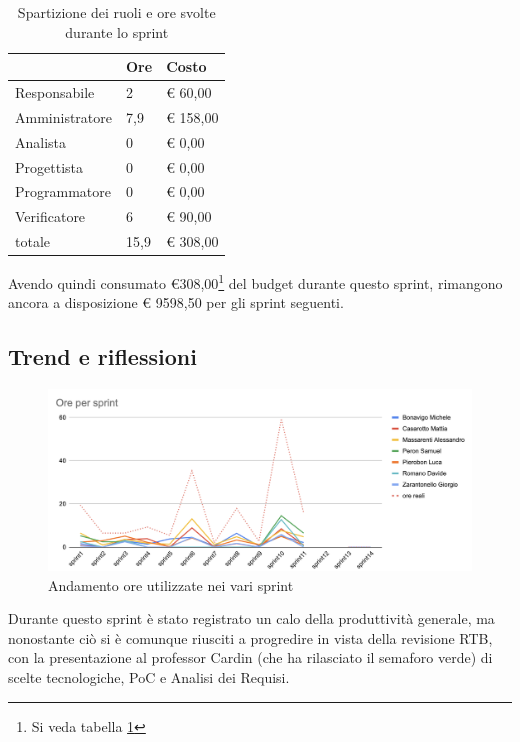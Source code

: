 \begin{table}[ht]
    \begin{tabularx}{\linewidth}{X|l|l}
    \rowcolor{gray!30}& Ore & Costo \\
    \hline
    
    Responsabile & 2 & € 60,00 \\
    \rowcolor{gray!10}Amministratore & 7,9 & € 158,00 \\
    Analista & 0 & € 0,00 \\
    \rowcolor{gray!10}Progettista & 0 & € 0,00 \\
    Programmatore & 0 & € 0,00 \\
    \rowcolor{gray!10}Verificatore & 6 &€ 90,00 \\
    totale & 15,9 & € 308,00 \\
    \end{tabularx}
    \caption{\label{costi-ruolo}Spartizione dei ruoli e ore svolte durante lo sprint}
\end{table}

Avendo quindi consumato €308,00\footnote{Si veda tabella \ref{costi-ruolo}} del budget durante questo sprint, rimangono ancora a disposizione € 9598,50 per gli sprint seguenti.

\subsection{Trend e riflessioni}\label{subsec:trend}

\begin{figure}[H]
    \includegraphics[width=\linewidth]{img/andamento.png}
    \caption{Andamento ore utilizzate nei vari sprint}\label{img:andamento}
\end{figure}

Durante questo sprint è stato registrato un calo della produttività generale, ma nonostante ciò si è comunque riusciti a progredire in vista della revisione RTB, con la presentazione al professor Cardin (che ha rilasciato il semaforo verde) di scelte tecnologiche, PoC e Analisi dei Requisi.

